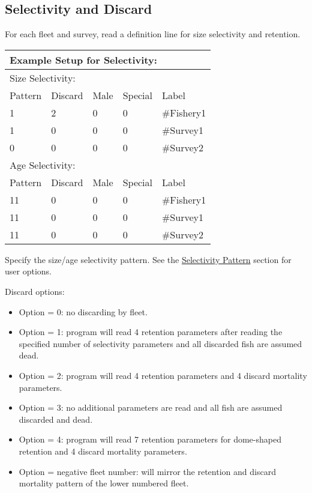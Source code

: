 \subsection{Selectivity and Discard}
For each fleet and survey, read a definition line for size selectivity and retention. 

\begin{center}
	\begin{longtable}{p{2cm} p{2cm} p{2cm} p{2cm} p{6.5cm} }
		\multicolumn{5}{l}{Example Setup for Selectivity:}\Tstrut\\
		\hline
		\multicolumn{5}{l}{Size Selectivity:}\Tstrut\\
		Pattern & Discard & Male & Special & Label \Bstrut\\
		\hline
		1  & 2 & 0 & 0 & \#Fishery1\Tstrut\\
		1  & 0 & 0 & 0 & \#Survey1\\
		0  & 0 & 0 & 0 & \#Survey2\Bstrut\\
		\hline
		
		\multicolumn{5}{l}{Age Selectivity:}\Tstrut\\
		Pattern & Discard & Male & Special & Label \Bstrut\\
		\hline
		11  & 0 & 0 & 0 & \#Fishery1\Tstrut\\
		11  & 0 & 0 & 0 & \#Survey1\\
		11  & 0 & 0 & 0 & \#Survey2\Bstrut\\
		\hline
	\end{longtable}
\end{center}

Specify the size/age selectivity pattern. See the \hyperlink{SelexPattern}{Selectivity Pattern} section for user options.

\hypertarget{DomeRetention}{Discard options:}
\begin{itemize}
	\item Option = 0: no discarding by fleet.
	\item Option = 1: program will read 4 retention parameters after reading the specified number of selectivity parameters and all discarded fish are assumed dead.  
	\item Option = 2: program will read 4 retention parameters and 4 discard mortality parameters.  
	\item Option = 3: no additional parameters are read and all fish are assumed discarded and dead.
	\item Option = 4: program will read 7 retention parameters for dome-shaped retention and 4 discard mortality parameters.  
	\item Option = negative fleet number: will mirror the retention and discard mortality pattern of the lower numbered fleet.
\end{itemize}

